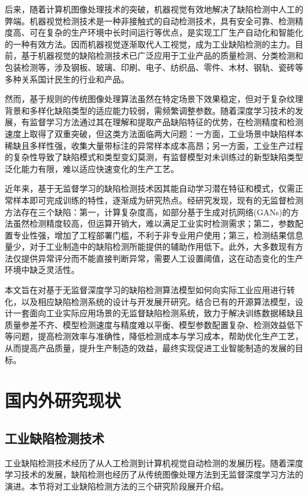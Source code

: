 \documentclass[
  ]{njuthesis}
\begin{document}
后来，随着计算机图像处理技术的突破，机器视觉有效地解决了缺陷检测中人工的弊端。机器视觉检测技术是一种非接触式的自动检测技术，具有安全可靠、检测精度高、可在复杂的生产环境中长时间运行等优点，是实现工厂生产自动化和智能化的一种有效方法\cite{[4]}。因而机器视觉逐渐取代人工视觉，成为工业缺陷检测的主力。目前，基于机器视觉的缺陷检测技术已广泛应用于工业产品的质量检测、分类检测和包装检测等，涉及钢板、玻璃、印刷、电子、纺织品、零件、木材、钢轨、瓷砖等多种关系国计民生的行业和产品\cite{[5]}。

然而，基于规则的传统图像处理算法虽然在特定场景下效果稳定，但对于复杂纹理背景和多样化缺陷类型的适应能力较弱，需频繁调整参数。随着深度学习技术的发展，有监督学习方法通过其在理解和提取产品缺陷特征的优势，在检测精度和检测速度上取得了双重突破，但这类方法面临两大问题：一方面，工业场景中缺陷样本稀缺且多样性强，收集大量带标注的异常样本成本高昂；另一方面，工业生产过程的复杂性导致了缺陷模式和类型变幻莫测，有监督模型对未训练过的新型缺陷类型泛化能力有限，难以适应快速变化的生产工艺。

近年来，基于无监督学习的缺陷检测技术因其能自动学习潜在特征和模式，仅需正常样本即可完成训练的特性，逐渐成为研究热点。经研究发现，现有的无监督检测方法存在三个缺陷：第一，计算复杂度高，如部分基于生成对抗网络(GANs)的方法虽然检测精度较高，但运算开销大，难以满足工业实时检测需求；第二，参数配置专业性强，增加了工程部署门槛，不利于非专业用户使用；第三，检测结果信息量少，对于工业制造中的缺陷检测所能提供的辅助作用低下。此外，大多数现有方法仅提供异常评分而不能直接判断异常，需要人工设置阈值，这在动态变化的生产环境中缺乏灵活性。

本文旨在对基于无监督深度学习的缺陷检测算法模型如何向实际工业应用进行转化，以及相应缺陷检测系统的设计与开发展开研究。结合已有的开源算法模型，设计一套面向工业实际应用场景的无监督缺陷检测系统，致力于解决训练数据稀缺且质量参差不齐、模型检测速度与精度难以平衡、模型参数配置复杂、检测效益低下等问题，提高检测效率与准确性，降低检测成本与学习成本，帮助优化生产工艺，从而提高产品质量，提升生产制造的效益，最终实现促进工业智能制造的发展的目标。

\section{国内外研究现状}

\subsection{工业缺陷检测技术}

工业缺陷检测技术经历了从人工检测到计算机视觉自动检测的发展历程。随着深度学习技术的发展，缺陷检测也经历了从传统图像处理方法到无监督深度学习方法的演进。本节将对工业缺陷检测方法的三个研究阶段展开介绍。
\end{document}
